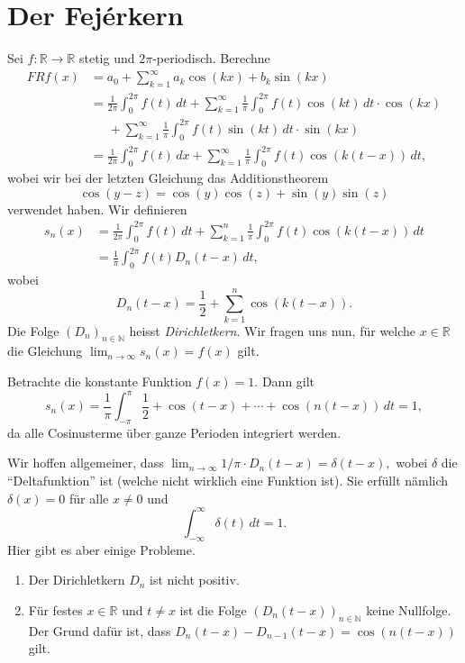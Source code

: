 \documentclass[../main.tex]{subfiles}
\begin{document}
\section{Der Fejérkern}
Sei $f \colon \mathbb{R} \to \mathbb{R}$ stetig
und $2\pi$-periodisch.
Berechne
\begin{align*}
  FRf(x)
  & = a_0 + \sum_{k=1}^{\infty} a_k \cos(kx) + b_k \sin(kx)\\
  & = \frac{1}{2\pi} \int_{0}^{2\pi} f(t) \, dt +
  \sum_{k=1}^{\infty} \frac{1}{\pi}\int_{0}^{2\pi} 
  f(t) \cos(kt) \, dt
  \cdot \cos(kx) \\
  &\;\;\;\;\; + \sum_{k=1}^{\infty} \frac{1}{\pi} \int_{0}^{2\pi} 
  f(t) \sin(kt)\, dt \cdot \sin(kx)\\
  &= \frac{1}{2\pi} \int_{0}^{2\pi} f(t) \, dx
  + \sum_{k=1}^{\infty} \frac{1}{\pi} \int_{0}^{2\pi} 
  f(t) \cos(k(t-x))\, dt,
\end{align*}
wobei wir bei der letzten Gleichung das Additionstheorem
\[
  \cos(y - z) = \cos(y) \cos(z) + \sin(y) \sin(z)
\]
verwendet haben.
Wir definieren
\begin{align*}
 s_n(x) 
 & = \frac{1}{2\pi} \int_{0}^{2\pi} f(t) \, dt
  + \sum_{k=1}^{n} \frac{1}{\pi}
  \int_{0}^{2\pi} f(t) \cos(k(t-x)) \, dt \\
 &= \frac{1}{\pi} \int_{0}^{2\pi} f(t) D_n(t - x) \, dt,
\end{align*}
wobei
\[
  D_n(t - x) = \frac{1}{2} + \sum_{k=1}^{n} \cos(k(t-x)).
\]
Die Folge ${(D_{n})}_{n \in \mathbb{N}}$ heisst
\emph{Dirichletkern}.
Wir fragen uns nun,
für welche $x \in \mathbb{R}$ die Gleichung
\(
  \lim_{n \to \infty} s_n(x) = f(x)
\)
gilt.

\begin{example}
  Betrachte die konstante Funktion $f(x) = 1$.
  Dann gilt
  \[
    s_n (x) = \frac{1}{\pi} \int_{-\pi}^{\pi} \frac{1}{2} + \cos(t - x) + \cdots +
    \cos(n(t-x))\, dt = 1,
  \]
  da alle Cosinusterme über ganze Perioden integriert werden.
\end{example}

Wir hoffen allgemeiner, dass
\(
  \lim_{n \to \infty} 1/\pi \cdot D_n(t-x) = \delta(t-x),
\)
wobei $\delta$ die ``Deltafunktion'' ist (welche nicht wirklich
eine Funktion ist). Sie erfüllt nämlich $\delta(x) = 0$
für alle $x \neq 0$ und
\[
  \int_{-\infty}^{\infty} \delta(t) \, dt = 1.
\]
Hier gibt es aber einige Probleme.
\begin{enumerate}[(1)]
  \item Der Dirichletkern $D_n$ ist nicht positiv.
  \item Für festes $x \in \mathbb{R}$ und $t \neq x$ 
    ist die Folge ${(D_n(t-x))}_{n \in \mathbb{N}}$
     keine Nullfolge.
     Der Grund dafür ist, dass
     \(
       D_n(t- x) - D_{n-1}(t-x)
       = \cos(n (t-x))
     \) gilt.
\end{enumerate}
\end{document}
